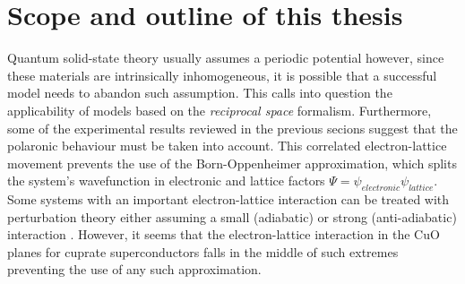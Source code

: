 \section{Scope and outline of this thesis}
\label{sec:scope}



Quantum solid-state theory usually assumes a periodic potential however, since these materials are intrinsically inhomogeneous, it is possible that a successful model needs to abandon such assumption. 
This calls into question the applicability of models based on the \textit{reciprocal space} formalism.
Furthermore, some of the experimental results reviewed in the previous secions suggest that the polaronic behaviour must be taken into account.
This correlated electron-lattice movement prevents the use of the Born-Oppenheimer approximation, which splits the system's wavefunction in electronic and lattice factors $\Psi = \psi_{electronic}\psi_{lattice}$.
Some systems with an important electron-lattice interaction can be treated with perturbation theory either assuming a small (adiabatic) or strong (anti-adiabatic) interaction \cite{?}. 
However, it seems that the electron-lattice interaction in the CuO planes for cuprate superconductors falls in the middle of such extremes \cite{MustredeLeon1992} preventing the use of any such approximation.

